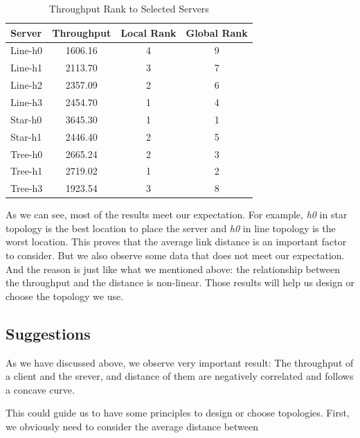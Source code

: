 \begin{table}[ht]
\centering
	\caption{Throughput Rank to Selected Servers}
	\label{table:throughput}
	\begin{tabular}{|l||c|c|c|}
		\hline 
		Server   &  Throughput & Local Rank & Global Rank \\ \hline\hline
		Line-h0  &   1606.16  &  4   &  9 \\ \hline 
		Line-h1  &   2113.70  &  3   &  7 \\ \hline 
		Line-h2  &   2357.09  &  2   &  6 \\ \hline 
		Line-h3  &   2454.70  &  1   &  4 \\ \hline\hline 
		Star-h0  &   3645.30  &  1   &  1 \\ \hline 
        Star-h1  &   2446.40  &  2   &  5 \\ \hline\hline 
		Tree-h0  &   2665.24  &  2   &  3 \\ \hline 
		Tree-h1  &   2719.02  &  1   &  2 \\ \hline 
		Tree-h3  &   1923.54  &  3   &  8 \\ \hline 
	\end{tabular}
\end{table}
As we can see, most of the results meet our expectation. For example, {\it h0} in 
star topology is the best location to place the server and {\it h0} in line topology 
is the worst location. This proves that the average link 
distance is an important factor to consider. But we also observe some data that does not 
meet our expectation. And the reason is just like what we mentioned above: the relationship 
between the throughput and the distance is non-linear. Those results will help
us design or choose the topology we use.

\subsection{Suggestions} \label{subsec:suggestions}
As we have discussed above, we observe very important result:
The throughput of a client and the srever, and distance of them are negatively correlated 
and follows a concave curve.

This could guide us to have some principles to design or choose topologies. First, we obviously 
need to consider the average distance between 
